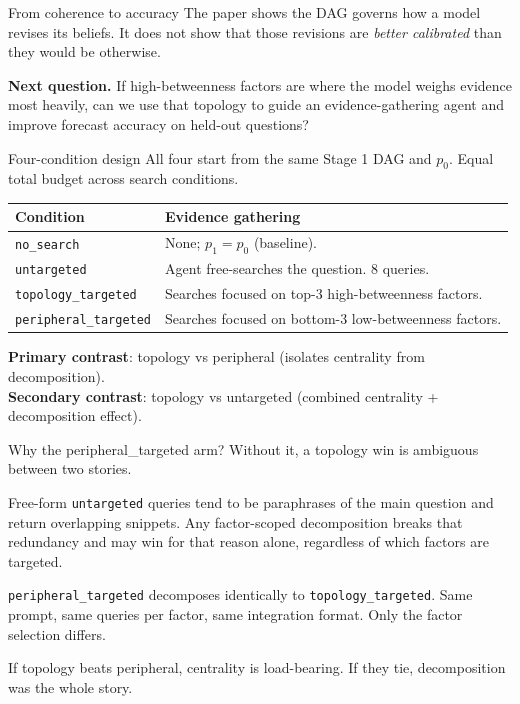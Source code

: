 \documentclass[aspectratio=169]{beamer}
\begin{document}
\begin{frame}{From coherence to accuracy}
The paper shows the DAG governs how a model revises its beliefs. It does not show that those revisions are \emph{better calibrated} than they would be otherwise.

\vspace{0.5em}
\textbf{Next question.} If high-betweenness factors are where the model weighs evidence most heavily, can we use that topology to guide an evidence-gathering agent and improve forecast accuracy on held-out questions?
\end{frame}

\begin{frame}{Four-condition design}
All four start from the same Stage 1 DAG and $p_0$. Equal total budget across search conditions.

\vspace{0.3em}
\begin{tabular}{@{}p{3.3cm}p{8cm}@{}}
\toprule
\textbf{Condition} & \textbf{Evidence gathering} \\
\midrule
\texttt{no\_search} & None; $p_1 = p_0$ (baseline). \\
\addlinespace
\texttt{untargeted} & Agent free-searches the question. 8 queries. \\
\addlinespace
\texttt{topology\_targeted} & Searches focused on top-3 high-betweenness factors. \\
\addlinespace
\texttt{peripheral\_targeted} & Searches focused on bottom-3 low-betweenness factors. \\
\bottomrule
\end{tabular}

\vspace{0.6em}
\small \textbf{Primary contrast}: topology vs peripheral (isolates centrality from decomposition). \\
\textbf{Secondary contrast}: topology vs untargeted (combined centrality + decomposition effect).
\end{frame}

\begin{frame}{Why the peripheral\_targeted arm?}
Without it, a topology win is ambiguous between two stories.

\vspace{0.4em}
Free-form \texttt{untargeted} queries tend to be paraphrases of the main question and return overlapping snippets. Any factor-scoped decomposition breaks that redundancy and may win for that reason alone, regardless of which factors are targeted.

\vspace{0.6em}
\texttt{peripheral\_targeted} decomposes identically to \texttt{topology\_targeted}. Same prompt, same queries per factor, same integration format. Only the factor selection differs.

\vspace{0.6em}
If topology beats peripheral, centrality is load-bearing. If they tie, decomposition was the whole story.
\end{frame}
\end{document}
